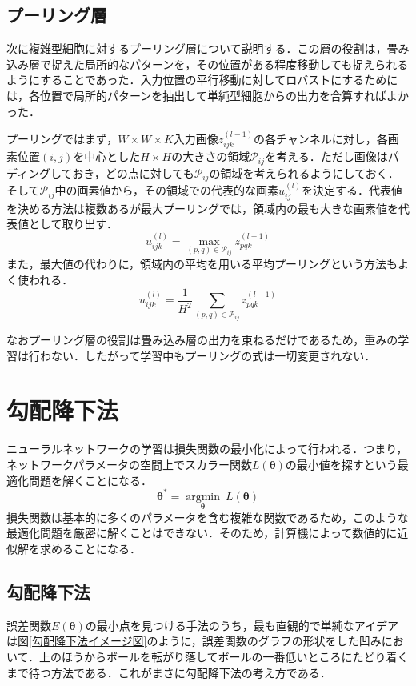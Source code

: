 \documentclass[a4paper,11pt]{jsreport}
\begin{document}
\subsection{プーリング層}
次に複雑型細胞に対するプーリング層について説明する．この層の役割は，畳み込み層で捉えた局所的なパターンを，その位置がある程度移動しても捉えられるようにすることであった．入力位置の平行移動に対してロバストにするためには，各位置で局所的パターンを抽出して単純型細胞からの出力を合算すればよかった．\par
プーリングではまず，$W \times W \times K$入力画像$z_{ijk}^{(l-1)}$の各チャンネルに対し，各画素位置$(i,j)$を中心とした$H \times H$の大きさの領域$\mathcal{P}_{ij}$を考える．ただし画像はパディングしておき，どの点に対しても$\mathcal{P}_{ij}$の領域を考えられるようにしておく．そして$\mathcal{P}_{ij}$中の画素値から，その領域での代表的な画素$u_{ij}^{(l)}$を決定する．代表値を決める方法は複数あるが最大プーリングでは，領域内の最も大きな画素値を代表値として取り出す．
\begin{equation}
  u_{ijk}^{(l)}
  = \underset{(p,q) \in \mathcal{P}_{ij}} {\operatorname{max}} z_{pqk}^{(l-1)} 
\end{equation}
また，最大値の代わりに，領域内の平均を用いる平均プーリングという方法もよく使われる．
\begin{equation}
  u_{ijk}^{(l)}
  = \frac{1}{H^2} \sum_{(p,q) \in \mathcal{P}_{ij}} z_{pqk}^{(l-1)} 
\end{equation}\par
なおプーリング層の役割は畳み込み層の出力を束ねるだけであるため，重みの学習は行わない．したがって学習中もプーリングの式は一切変更されない．



\section{勾配降下法}
ニューラルネットワークの学習は損失関数の最小化によって行われる．つまり，ネットワークパラメータの空間上でスカラー関数$L(\bm{\theta})$の最小値を探すという最適化問題を解くことになる．
\begin{equation}
  \bm{\theta}^* = \underset{\bm{\theta}} {\operatorname{argmin}} \ L(\bm{\theta})
\end{equation}
損失関数は基本的に多くのパラメータを含む複雑な関数であるため，このような最適化問題を厳密に解くことはできない．そのため，計算機によって数値的に近似解を求めることになる．\par

\subsection{勾配降下法}
誤差関数$E(\bm{\theta})$の最小点を見つける手法のうち，最も直観的で単純なアイデアは図\ref{勾配降下法イメージ図}のように，誤差関数のグラフの形状をした凹みにおいて．上のほうからボールを転がり落してボールの一番低いところにたどり着くまで待つ方法である．これがまさに勾配降下法の考え方である．\par
\end{document}

